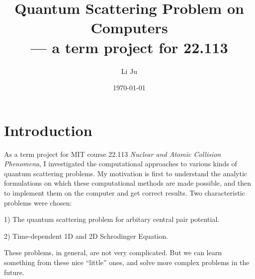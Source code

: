 
\newcommand{\PSbox}[3]{\mbox{\special{psfile=/tmp/liju/#1}\hspace{#2}\rule{0pt}{#3}}}
\newcommand{\psA}[1]{\PSbox{#1 hoffset=-40 voffset=-105 hscale=45 vscale=50}{7.5cm}{7.2cm}}
\newcommand{\psB}[1]{\PSbox{#1 hoffset=-98 voffset=-200 hscale=100 vscale=100}{15cm}{14.4cm}}
\newcommand{\psC}[1]{\PSbox{#1 hoffset=-115 voffset=-330 hscale=105 vscale=160}{15cm}{21.4cm}}
\newcommand{\ee}{\begin{equation}}
\newcommand{\ed}{\end{equation}}
\newcommand{\mm}{\begin{eqnarray}}
\newcommand{\md}{\end{eqnarray}}
\newcommand{\nn}{\nonumber\\}
\newcommand{\av}[1]{< #1 >}
\newcommand{\pdf}[2]{\frac{\partial #1}{\partial #2}}
\newcommand{\pdd}[2]{\frac{\partial^{2} #1}{\partial #2^{2}}}
\newcommand{\f}[2]{\frac{#1}{#2}}

\setlength{\parskip}{\baselineskip}
\setlength{\parindent}{0em}
\title{Quantum Scattering Problem on Computers\\
  --- a term project for 22.113}
\date{\today}
\author{Li Ju}

\maketitle
\tableofcontents
\newpage
\chapter{Introduction}

As a term project for MIT course 22.113 {\em Nuclear and Atomic
Collision Phenomena}, I investigated the computational approaches to
various kinds of quantum scattering problems. My motivation is first
to understand the analytic formulations on which these computational
methods are made possible, and then to implement them on the computer
and get correct results. Two characteristic problems were chosen:

1) The quantum scattering problem for arbitary central pair potential.

2) Time-dependent 1D and 2D Schrodinger Equation.

These problems, in general, are not very complicated. But we can learn
something from these nice ``little'' ones, and solve more complex
problems in the future.\\


